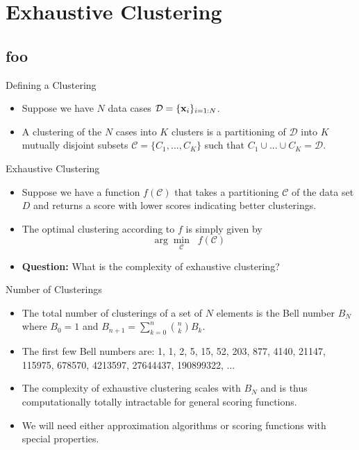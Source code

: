 \documentclass[serif,xcolor=pdftex,dvipsnames,table,hyperref={bookmarks=false,breaklinks}]{beamer}
\begin{document}
\section{Exhaustive Clustering}
\subsection{foo}
 
\begin{frame}[t]{Defining a Clustering}
 
\begin{itemize}
\item Suppose we have $N$ data cases $\mathcal{D}=\{{\mathbf{x}}_i\}_{i=1:N}$.
 
 \pause \item A clustering of the $N$ cases into $K$ clusters is a partitioning 
 of $\mathcal{D}$ into $K$ mutually disjoint subsets 
 $\mathcal{C}=\{C_1,...,C_K\}$ such that 
 $C_1 \cup ... \cup C_K = \mathcal{D}$.
 
\end{itemize} 
\end{frame}

\begin{frame}[t]{Exhaustive Clustering}
 \begin{itemize}
 \item Suppose we have a function $f(\mathcal{C})$ that takes a partitioning 
 $\mathcal{C}$ of the data set $D$ and returns a score with lower scores 
 indicating better clusterings.
 
 \pause\item The optimal clustering according to $f$ is simply given by 
 $$\arg\min_{\mathcal{C}} \;\;f(\mathcal{C})$$
 
 \pause\item \textbf{Question:} What is the complexity of exhaustive clustering?
\end{itemize} 
\end{frame}

\begin{frame}[t]{Number of Clusterings}

\begin{itemize}

 \item The total number of clusterings of a set of $N$ elements is the 
Bell number $B_N$ where $B_0=1$ and $B_{n+1} = \sum_{k=0}^n {n \choose k} B_k$.

\pause \item The first few Bell numbers are: 1, 1, 2, 5, 15, 52, 203, 877, 
4140, 21147, 115975, 678570, 4213597, 27644437, 190899322, ...

\pause \item The complexity of exhaustive clustering scales with $B_N$ and is 
thus computationally totally intractable for general scoring functions. 

\pause\item We will need either approximation algorithms or scoring functions 
with special properties. 
\end{itemize}

\end{frame}
\end{document}
